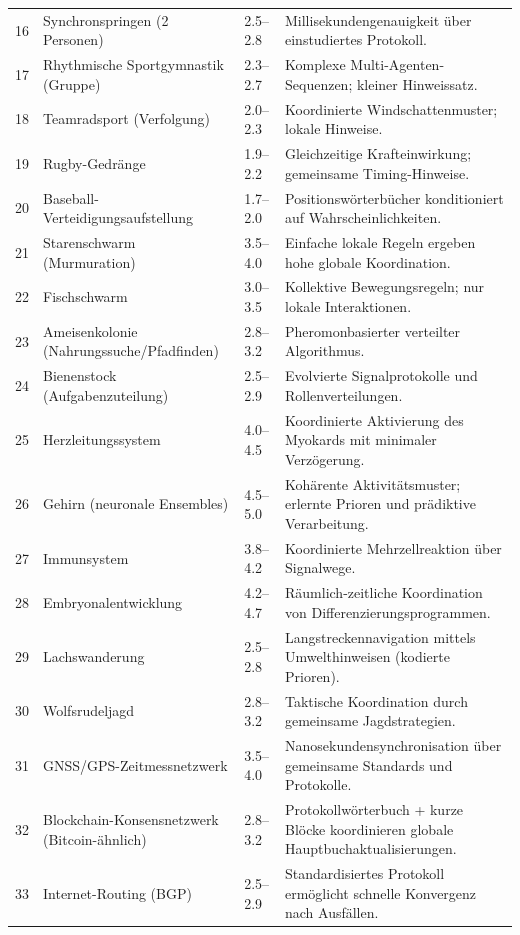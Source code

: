 \documentclass[13pt,a4paper]{article}
\begin{document}
\begin{longtable}{|p{0.8cm}|p{6.2cm}|p{3.0cm}|p{5.7cm}|}
		16 & Synchronspringen (2 Personen) & 2.5--2.8 & Millisekundengenauigkeit über einstudiertes Protokoll. \\
		17 & Rhythmische Sportgymnastik (Gruppe) & 2.3--2.7 & Komplexe Multi-Agenten-Sequenzen; kleiner Hinweissatz. \\
		18 & Teamradsport (Verfolgung) & 2.0--2.3 & Koordinierte Windschattenmuster; lokale Hinweise. \\
		19 & Rugby-Gedränge & 1.9--2.2 & Gleichzeitige Krafteinwirkung; gemeinsame Timing-Hinweise. \\
		20 & Baseball-Verteidigungsaufstellung & 1.7--2.0 & Positionswörterbücher konditioniert auf Wahrscheinlichkeiten. \\
		21 & Starenschwarm (Murmuration) & 3.5--4.0 & Einfache lokale Regeln ergeben hohe globale Koordination. \\
		22 & Fischschwarm & 3.0--3.5 & Kollektive Bewegungsregeln; nur lokale Interaktionen. \\
		23 & Ameisenkolonie (Nahrungssuche/Pfadfinden) & 2.8--3.2 & Pheromonbasierter verteilter Algorithmus. \\
		24 & Bienenstock (Aufgabenzuteilung) & 2.5--2.9 & Evolvierte Signalprotokolle und Rollenverteilungen. \\
		25 & Herzleitungssystem & 4.0--4.5 & Koordinierte Aktivierung des Myokards mit minimaler Verzögerung. \\
		26 & Gehirn (neuronale Ensembles) & 4.5--5.0 & Kohärente Aktivitätsmuster; erlernte Prioren und prädiktive Verarbeitung. \\
		27 & Immunsystem & 3.8--4.2 & Koordinierte Mehrzellreaktion über Signalwege. \\
		28 & Embryonalentwicklung & 4.2--4.7 & Räumlich-zeitliche Koordination von Differenzierungsprogrammen. \\
		29 & Lachswanderung & 2.5--2.8 & Langstreckennavigation mittels Umwelthinweisen (kodierte Prioren). \\
		30 & Wolfsrudeljagd & 2.8--3.2 & Taktische Koordination durch gemeinsame Jagdstrategien. \\
		31 & GNSS/GPS-Zeitmessnetzwerk & 3.5--4.0 & Nanosekundensynchronisation über gemeinsame Standards und Protokolle. \\
		32 & Blockchain-Konsensnetzwerk (Bitcoin-ähnlich) & 2.8--3.2 & Protokollwörterbuch + kurze Blöcke koordinieren globale Hauptbuchaktualisierungen. \\
		33 & Internet-Routing (BGP) & 2.5--2.9 & Standardisiertes Protokoll ermöglicht schnelle Konvergenz nach Ausfällen. \\

\end{longtable}
\end{document}
